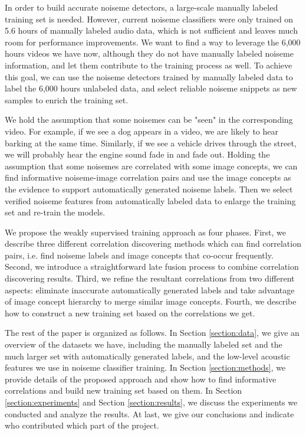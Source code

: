 \documentclass[conference, 11pt, onecolumn]{IEEEtran}
\begin{document}
In order to build accurate noiseme detectors, a large-scale manually labeled training set is needed. However, current noiseme classifiers were only trained on 5.6 hours of manually labeled audio data, which is not sufficient and leaves much room for performance improvements. We want to find a way to leverage the 6,000 hours videos we have now, although they do not have manually labeled noiseme information, and let them contribute to the training process as well. To achieve this goal, we can use the noiseme detectors trained by manually labeled data to label the 6,000 hours unlabeled data, and select reliable noiseme snippets as new samples to enrich the training set.

We hold the assumption that some noisemes can be "seen" in the corresponding video. For example, if we see a dog appears in a video, we are likely to hear barking at the same time. Similarly, if we see a vehicle drives through the street, we will probably hear the engine sound fade in and fade out. Holding the assumption that some noisemes are correlated with some image concepts, we can find informative noiseme-image correlation pairs and use the image concepts as the evidence to support automatically generated noiseme labels. Then we select verified noiseme features from automatically labeled data to enlarge the training set and re-train the models.

We propose the weakly supervised training approach as four phases. First, we describe three different correlation discovering methods which can find correlation pairs, i.e. find noiseme labels and image concepts that co-occur frequently. Second, we introduce a straightforward late fusion process to combine correlation discovering results. Third, we refine the resultant correlations from two different aspects: eliminate inaccurate automatically generated labels and take advantage of image concept hierarchy to merge similar image concepts. Fourth, we describe how to construct a new training set based on the correlations we get.

The rest of the paper is organized as follows. In Section \ref{section:data}, we give an overview of the datasets we have, including the manually labeled set and the much larger set with automatically generated labels, and the low-level acoustic features we use in noiseme classifier training. In Section \ref{section:methods}, we provide details of the proposed approach and show how to find informative correlations and build new training set based on them. In Section \ref{section:experiments} and Section \ref{section:results}, we discuss the experiments we conducted and analyze the results. At last, we give our conclusions and indicate who contributed which part of the project.
\end{document}
